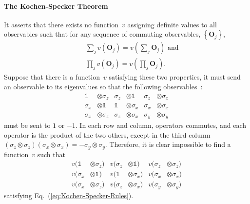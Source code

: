 \documentclass[english,reprint, aps, prl,superscriptaddress, showpacs,
showkeys, longbibliography, amsmath, amssymb]{revtex4-1}
\theoremstyle{plain}
\theoremstyle{definition}
\begin{document}
\paragraph{The Kochen-Specker Theorem}

It asserts that there exists no function~$v$ assigning definite
values to all observables such that for any sequence of commuting
observables, $\left\{ \mathbf{O}_{j}\right\} $,\begin{subequations}\label{eq:Kochen-Specker-Rules}
\begin{eqnarray}
 &  & \sum_{j}v\left(\mathbf{O}_{j}\right)=v\left(\sum_{j}\mathbf{O}_{j}\right)\textrm{ and}\\
 &  & \prod_{j}v\left(\mathbf{O}_{j}\right)=v\left(\prod_{j}\mathbf{O}_{j}\right).\label{eq:deterministic-product}
\end{eqnarray}
\end{subequations}Suppose that there is a function~$v$ satisfying
these two properties, it must send an observable to its eigenvalues
so that the following observables~\cite{Mermin1990Simple,peres1995quantum}:
\begin{equation}
\begin{aligned}\mathbb{1} & \otimes\sigma_{z} & \sigma_{z} & \otimes\mathbb{1} & \sigma_{z} & \otimes\sigma_{z}\\
\sigma_{x} & \otimes\mathbb{1} & \mathbb{1} & \otimes\sigma_{x} & \sigma_{x} & \otimes\sigma_{x}\\
\sigma_{x} & \otimes\sigma_{z} & \sigma_{z} & \otimes\sigma_{x} & \sigma_{y} & \otimes\sigma_{y}
\end{aligned}
\label{eq:MerminSquare}
\end{equation}
must be sent to $1$ or $-1$. In each row and column, operators commutes,
and each operator is the product of the two others, except in the
third column $\left(\sigma_{z}\otimes\sigma_{z}\right)\left(\sigma_{x}\otimes\sigma_{x}\right)=-\sigma_{y}\otimes\sigma_{y}$.
Therefore, it is clear impossible to find a function~$v$ such that
\begin{equation}
\begin{aligned}v(\mathbb{1} & \otimes\sigma_{z}) & v(\sigma_{z} & \otimes\mathbb{1}) & v(\sigma_{z} & \otimes\sigma_{z})\\
v(\sigma_{x} & \otimes\mathbb{1}) & v(\mathbb{1} & \otimes\sigma_{x}) & v(\sigma_{x} & \otimes\sigma_{x})\\
v(\sigma_{x} & \otimes\sigma_{z}) & v(\sigma_{z} & \otimes\sigma_{x}) & v(\sigma_{y} & \otimes\sigma_{y})
\end{aligned}
\label{eq:MerminSquare-values}
\end{equation}
satisfying Eq.~(\ref{eq:Kochen-Specker-Rules}).
\end{document}
